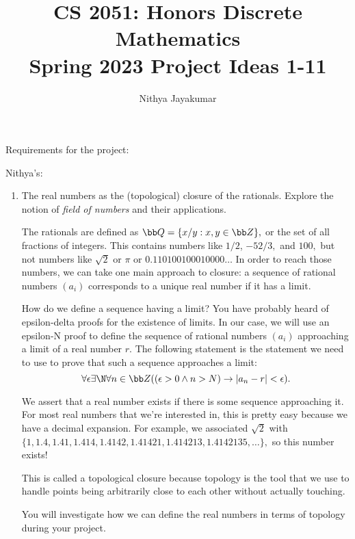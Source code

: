 \documentclass{article}
\title{\vspace{-1cm}CS 2051: Honors Discrete Mathematics\\Spring 2023 Project Ideas 1-11}
\author{Nithya Jayakumar}
\date{}
\begin{document}
\maketitle

Requirements for the project:


\bigskip
Nithya's:
\begin{enumerate}[label = \arabic*.]
    \item The real numbers as the (topological) closure of the rationals. Explore the notion of {\it field of numbers} and their applications. 

        The rationals are defined as $\bb Q = \{x/y : x,y\in\bb Z\},$ or the set of all fractions of integers.
        This contains numbers like $1/2$, $-52/3,$ and $100,$ but not numbers like $\sqrt 2$ or $\pi$ or $0.110100100010000\ldots$
        In order to reach those numbers, we can take one main approach to closure: a sequence of rational numbers $(a_i)$ corresponds to a unique real number if it has a limit.

        How do we define a sequence having a limit?
        You have probably heard of epsilon-delta proofs for the existence of limits.
        In our case, we will use an epsilon-N proof to define the sequence of rational numbers $(a_i)$ approaching a limit of a real number $r.$
        The following statement is the statement we need to use to prove that such a sequence approaches a limit:
        $$\forall\epsilon\exists\N\forall n\in\bb Z ((\epsilon>0\land n>N) \to |a_n-r|<\epsilon).$$

        We assert that a real number exists if there is some sequence approaching it.
        For most real numbers that we're interested in, this is pretty easy because we have a decimal expansion.
        For example, we associated $\sqrt 2$ with $\{1,1.4,1.41,1.414,1.4142,1.41421,1.414213,1.4142135,\ldots\},$ so this number exists!

        This is called a topological closure because topology is the tool that we use to handle points being arbitrarily close to each other without actually touching.
        
        You will investigate how we can define the real numbers in terms of topology during your project.


\end{enumerate}
\end{document}

